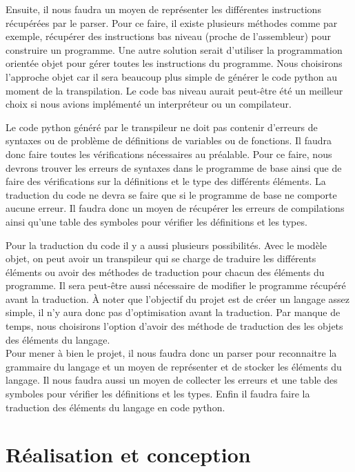\documentclass[a4paper]{article}%
\begin{document}
Ensuite, il nous faudra un moyen de représenter les différentes instructions
récupérées par le \gls{parser}. Pour ce faire, il existe plusieurs méthodes
comme par exemple, récupérer des instructions bas niveau (proche de
l'assembleur) pour construire un programme. Une autre solution serait d'utiliser
la programmation orientée objet pour gérer toutes les instructions du programme.
Nous choisirons l'approche objet car il sera beaucoup plus simple de générer le
code python au moment de la transpilation. Le code bas niveau aurait peut-être
été un meilleur choix si nous avions implémenté un interpréteur ou un
compilateur.

Le code python généré par le transpileur ne doit pas contenir d'erreurs de
syntaxes ou de problème de définitions de variables ou de fonctions. Il faudra
donc faire toutes les vérifications nécessaires au préalable. Pour ce faire,
nous devrons trouver les erreurs de syntaxes dans le programme de base ainsi que
de faire des vérifications sur la définitions et le type des différents
éléments. La traduction du code ne devra se faire que si le programme de base ne
comporte aucune erreur. Il faudra donc un moyen de récupérer les erreurs de
compilations ainsi qu'une table des symboles pour vérifier les définitions et
les types.

Pour la traduction du code il y a aussi plusieurs possibilités. Avec le modèle
objet, on peut avoir un transpileur qui se charge de traduire les différents
éléments ou avoir des méthodes de traduction pour chacun des éléments du
programme. Il sera peut-être aussi nécessaire de modifier le programme récupéré
avant la traduction. À noter que l'objectif du projet est de créer un langage
assez simple, il n'y aura donc pas d'optimisation avant la traduction. Par
manque de temps, nous choisirons l'option d'avoir des méthode de traduction des
les objets des éléments du langage.\\

Pour mener à bien le projet, il nous faudra donc un \gls{parser} pour reconnaitre la
grammaire du langage et un moyen de représenter et de stocker les éléments du
langage. Il nous faudra aussi un moyen de collecter les erreurs et une table des
symboles pour vérifier les définitions et les types. Enfin il faudra faire la
traduction des éléments du langage en code python.

\clearpage
\part{Réalisation et conception}
\end{document}
